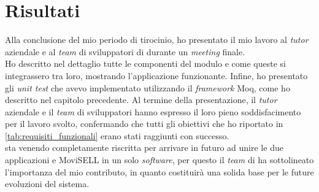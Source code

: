 \section{Risultati}
Alla conclusione del mio periodo di tirocinio, ho presentato il mio lavoro al \textit{tutor} aziendale e al \textit{team} di 
sviluppatori di {\company} durante un \textit{meeting} finale.\\
Ho descritto nel dettaglio tutte le componenti del modulo e come queste si integrassero tra loro, mostrando 
l'applicazione funzionante. Infine, ho presentato gli \textit{unit test} che avevo implementato utilizzando il 
\textit{framework} Moq, come ho descritto nel capitolo precedente.
Al termine della presentazione, il \textit{tutor} aziendale e il \textit{team} di sviluppatori hanno espresso il loro pieno 
soddisfacimento per il lavoro svolto, confermando che tutti gli obiettivi che ho riportato in \ref{tab:requisiti_funzionali} 
erano stati raggiunti con successo.\\
{\movi} sta venendo completamente riscritta per arrivare in futuro ad unire le due applicazioni {\movi} e MoviSELL in un 
solo \textit{software}, per questo il \textit{team} di {\company} ha sottolineato l'importanza del mio contributo, in quanto 
costituirà una solida base per le future evoluzioni del sistema.